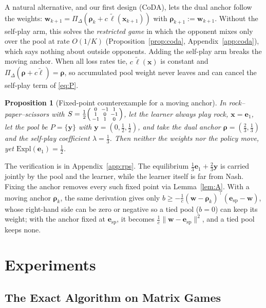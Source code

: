 \documentclass{article} %
\theoremstyle{plain}
\newtheorem{proposition}[theorem]{Proposition}
\theoremstyle{remark}
\newcommand{\Expl}{\mathrm{Expl}}
\newcommand{\Proj}{\Pi}
\newcommand{\simplex}{\Delta}
\newcommand{\bx}{{\bm{x}}}
\newcommand{\by}{{\bm{y}}}
\newcommand{\bw}{{\bm{w}}}
\newcommand{\be}{{\bm{e}}}
\newcommand{\brho}{{\bm{\rho}}}
\newcommand{\bell}{{\bm{\ell}}}
\newcommand{\aug}{\tilde{\bell}}
\newcommand{\esp}{\be_{\mathrm{sp}}}
\newcommand{\coda}{CoDA}
\begin{document}
A natural alternative, and our first design (\coda{}), lets the dual anchor follow the weights: $\bw_{k+1}=\Proj_\simplex(\brho_k+c\,\aug(\bx_{k+1}))$ with $\brho_{k+1}:=\bw_{k+1}$. Without the self-play arm, this solves the \emph{restricted game} in which the opponent mixes only over the pool at rate $O(1/K)$ (Proposition~\ref{prop:coda}, Appendix~\ref{app:coda}), which says nothing about outside opponents. Adding the self-play arm breaks the moving anchor. When all loss rates tie, $c\,\aug(\bx)$ is constant and $\Proj_\simplex(\brho+c\aug)=\brho$, so accumulated pool weight never leaves and can cancel the self-play term of \eqref{eq:P}.

\begin{proposition}[Fixed-point counterexample for a moving anchor]
\label{prop:rps}
In rock--paper--scissors with $S=\tfrac12\begin{psmallmatrix}0&-1&1\\1&0&-1\\-1&1&0\end{psmallmatrix}$, let the learner always play rock, $\bx=\be_1$, let the pool be $P=\{\by\}$ with $\by=(0,\tfrac12,\tfrac12)$, and take the dual anchor $\brho=(\tfrac23,\tfrac13)$ and the self-play coefficient $\lambda=\tfrac13$. Then neither the weights nor the policy move, yet $\Expl(\be_1)=\tfrac12$.
\end{proposition}
The verification is in Appendix~\ref{app:rps}. The equilibrium $\tfrac13\be_1+\tfrac23\by$ is carried jointly by the pool and the learner, while the learner itself is far from Nash. Fixing the anchor removes every such fixed point via Lemma~\ref{lem:A}. With a moving anchor $\brho_k$, the same derivation gives only $b\ge-\tfrac1c(\bw-\brho_k)^\top(\esp-\bw)$, whose right-hand side can be zero or negative so a tied pool ($b=0$) can keep its weight; with the anchor fixed at $\esp$, it becomes $\tfrac1c\|\bw-\esp\|^2$, and a tied pool keeps none.

\section{Experiments}
\label{sec:exp}


\subsection{The Exact Algorithm on Matrix Games}
\label{sec:exp-theory}
\end{document}
